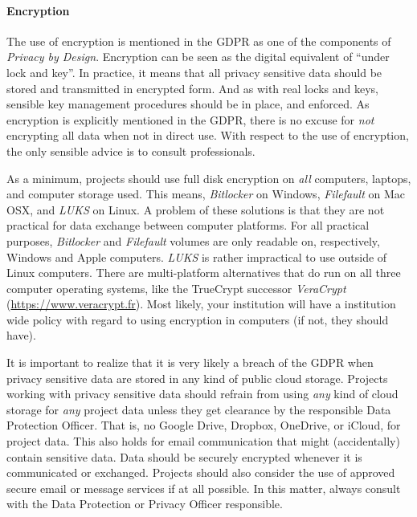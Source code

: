 \documentclass[10pt, a4paper]{article}
\begin{document}
\paragraph{Encryption} The use of encryption is mentioned in the GDPR as one of the components of \emph{Privacy by Design}. Encryption can be seen as the digital equivalent of ``under lock and key''. In practice, it means that all privacy sensitive data should be stored and transmitted in encrypted form. And as with real locks and keys, sensible key management procedures should be in place, and enforced. As encryption is explicitly mentioned in the GDPR, there is no excuse for \emph{not} encrypting all data when not in direct use. With respect to the use of encryption, the only sensible advice is to consult professionals. 

As a minimum, projects should use full disk encryption on \emph{all} computers, laptops, and computer storage used. This means, \emph{Bitlocker} on Windows, \emph{Filefault} on Mac OSX, and \emph{LUKS} on Linux. A problem of these solutions is that they are not practical for data exchange between computer platforms. For all practical purposes, \emph{Bitlocker} and \emph{Filefault} volumes are only readable on, respectively, Windows and Apple computers. \emph{LUKS} is rather impractical to use outside of Linux computers. There are multi-platform alternatives that do run on all three computer operating systems, like the TrueCrypt successor \emph{VeraCrypt} (\url{https://www.veracrypt.fr}). Most likely, your institution will have a institution wide policy with regard to using encryption in computers (if not, they should have).

It is important to realize that it is very likely a breach of the GDPR when privacy sensitive data are stored in any kind of public cloud storage. Projects working with privacy sensitive data should refrain from using \emph{any} kind of cloud storage for \emph{any} project data unless they get clearance by the responsible Data Protection Officer. That is, no Google Drive, Dropbox, OneDrive, or iCloud, for project data. This also holds for email communication that might (accidentally) contain sensitive data. Data should be securely encrypted whenever it is communicated or exchanged. Projects should also consider the use of approved secure email or message services if at all possible. In this matter, always consult with the Data Protection or Privacy Officer responsible.
\end{document}
